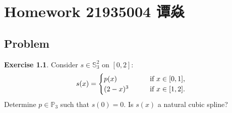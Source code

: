 \documentclass[a4paper]{book}
\makeatletter
\newcommand{\voidenvironment}[1]{%
  \expandafter\providecommand\csname env@#1@save@env\endcsname{}%
  \expandafter\providecommand\csname env@#1@process\endcsname{}%
  \@ifundefined{#1}{}{\RenewEnviron{#1}{}}%
}
\numberwithin{equation}{chapter}
\theoremstyle{definition}
\newtheorem{exc}[exm]{Exercise}
\makeatother
\begin{document}
\pagestyle{empty}
% 



\setcounter{chapter}{3}




\chapter{Homework 21935004 谭焱}



\section{Problem}\label{sec:1}

\begin{exc}
  Consider $s \in \mathbb{S}_3^2$ on $[0,2]$:
  \begin{align*}
    s(x) =
    \begin{cases}
      p(x) \qquad &\textmd{if } x \in [0,1], \\
      (2-x)^3  \qquad &\textmd{if } x \in [1,2].
    \end{cases}
  \end{align*}
  Determine $p \in \mathbb{P}_3$ such that $s(0) = 0$. Is $s(x)$ a natural cubic spline?
\end{exc}
\end{document}

